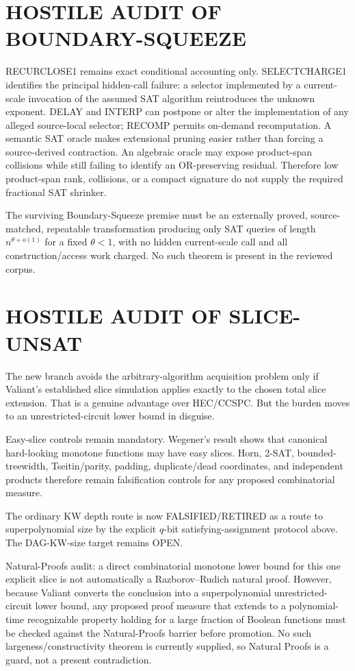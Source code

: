 \documentclass[11pt]{article}
\begin{document}
\section*{HOSTILE AUDIT OF BOUNDARY-SQUEEZE}
RECURCLOSE1 remains exact conditional accounting only. SELECTCHARGE1 identifies the principal hidden-call failure: a selector implemented by a current-scale invocation of the assumed SAT algorithm reintroduces the unknown exponent. DELAY and INTERP can postpone or alter the implementation of any alleged source-local selector; RECOMP permits on-demand recomputation. A semantic SAT oracle makes extensional pruning easier rather than forcing a source-derived contraction. An algebraic oracle may expose product-span collisions while still failing to identify an OR-preserving residual. Therefore low product-span rank, collisions, or a compact signature do not supply the required fractional SAT shrinker.

The surviving Boundary-Squeeze premise must be an externally proved, source-matched, repeatable transformation producing only SAT queries of length $n^{\theta+o(1)}$ for a fixed $\theta<1$, with no hidden current-scale call and all construction/access work charged. No such theorem is present in the reviewed corpus.

\section*{HOSTILE AUDIT OF SLICE-UNSAT}
The new branch avoids the arbitrary-algorithm acquisition problem only if Valiant's established slice simulation applies exactly to the chosen total slice extension. That is a genuine advantage over HEC/CCSPC. But the burden moves to an unrestricted-circuit lower bound in disguise.

Easy-slice controls remain mandatory. Wegener's result shows that canonical hard-looking monotone functions may have easy slices. Horn, 2-SAT, bounded-treewidth, Tseitin/parity, padding, duplicate/dead coordinates, and independent products therefore remain falsification controls for any proposed combinatorial measure.

The ordinary KW depth route is now FALSIFIED/RETIRED as a route to superpolynomial size by the explicit $q$-bit satisfying-assignment protocol above. The DAG-KW-size target remains OPEN.

Natural-Proofs audit: a direct combinatorial monotone lower bound for this one explicit slice is not automatically a Razborov--Rudich natural proof. However, because Valiant converts the conclusion into a superpolynomial unrestricted-circuit lower bound, any proposed proof measure that extends to a polynomial-time recognizable property holding for a large fraction of Boolean functions must be checked against the Natural-Proofs barrier before promotion. No such largeness/constructivity theorem is currently supplied, so Natural Proofs is a guard, not a present contradiction.
\end{document}
